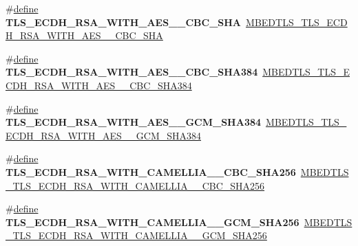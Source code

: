 \begin{DoxyCompactItemize}
\item 
\mbox{\label{compat-1_83_8h_a82177482378436bd1be8a62bb003f7de}} 
\#\hyperlink{structdefine}{define} {\bfseries T\+L\+S\+\_\+\+E\+C\+D\+H\+\_\+\+R\+S\+A\+\_\+\+W\+I\+T\+H\+\_\+\+A\+E\+S\+\_\+\_\+\+C\+B\+C\+\_\+\+S\+HA}~\hyperlink{ssl__ciphersuites_8h_a81461d59d23becd836c6a80bf9a6d1cf}{M\+B\+E\+D\+T\+L\+S\+\_\+\+T\+L\+S\+\_\+\+E\+C\+D\+H\+\_\+\+R\+S\+A\+\_\+\+W\+I\+T\+H\+\_\+\+A\+E\+S\+\_\+\_\+\+C\+B\+C\+\_\+\+S\+HA}
\item 
\mbox{\label{compat-1_83_8h_afd26d3c412c9b7a99d9b15fdc78a67eb}} 
\#\hyperlink{structdefine}{define} {\bfseries T\+L\+S\+\_\+\+E\+C\+D\+H\+\_\+\+R\+S\+A\+\_\+\+W\+I\+T\+H\+\_\+\+A\+E\+S\+\_\+\_\+\+C\+B\+C\+\_\+\+S\+H\+A384}~\hyperlink{ssl__ciphersuites_8h_a47e26eaa7be9c306df31bbbe97f9053d}{M\+B\+E\+D\+T\+L\+S\+\_\+\+T\+L\+S\+\_\+\+E\+C\+D\+H\+\_\+\+R\+S\+A\+\_\+\+W\+I\+T\+H\+\_\+\+A\+E\+S\+\_\+\_\+\+C\+B\+C\+\_\+\+S\+H\+A384}
\item 
\mbox{\label{compat-1_83_8h_ade1889f8b954d53bc910e1e016679d39}} 
\#\hyperlink{structdefine}{define} {\bfseries T\+L\+S\+\_\+\+E\+C\+D\+H\+\_\+\+R\+S\+A\+\_\+\+W\+I\+T\+H\+\_\+\+A\+E\+S\+\_\+\_\+\+G\+C\+M\+\_\+\+S\+H\+A384}~\hyperlink{ssl__ciphersuites_8h_aa3b28cdb1e1e0b0b8a7c91546ccbdd64}{M\+B\+E\+D\+T\+L\+S\+\_\+\+T\+L\+S\+\_\+\+E\+C\+D\+H\+\_\+\+R\+S\+A\+\_\+\+W\+I\+T\+H\+\_\+\+A\+E\+S\+\_\+\_\+\+G\+C\+M\+\_\+\+S\+H\+A384}
\item 
\mbox{\label{compat-1_83_8h_ac4a3fbbc789b041b9ee72cf931237a7a}} 
\#\hyperlink{structdefine}{define} {\bfseries T\+L\+S\+\_\+\+E\+C\+D\+H\+\_\+\+R\+S\+A\+\_\+\+W\+I\+T\+H\+\_\+\+C\+A\+M\+E\+L\+L\+I\+A\+\_\+\_\+\+C\+B\+C\+\_\+\+S\+H\+A256}~\hyperlink{ssl__ciphersuites_8h_a241fb84d48131e45e80eb4cd05ef1b69}{M\+B\+E\+D\+T\+L\+S\+\_\+\+T\+L\+S\+\_\+\+E\+C\+D\+H\+\_\+\+R\+S\+A\+\_\+\+W\+I\+T\+H\+\_\+\+C\+A\+M\+E\+L\+L\+I\+A\+\_\+\_\+\+C\+B\+C\+\_\+\+S\+H\+A256}
\item 
\mbox{\label{compat-1_83_8h_adf33633aa33826f92aed761e7c522e71}} 
\#\hyperlink{structdefine}{define} {\bfseries T\+L\+S\+\_\+\+E\+C\+D\+H\+\_\+\+R\+S\+A\+\_\+\+W\+I\+T\+H\+\_\+\+C\+A\+M\+E\+L\+L\+I\+A\+\_\+\_\+\+G\+C\+M\+\_\+\+S\+H\+A256}~\hyperlink{ssl__ciphersuites_8h_aa83af95fddb27edf5d8caf77a3d11452}{M\+B\+E\+D\+T\+L\+S\+\_\+\+T\+L\+S\+\_\+\+E\+C\+D\+H\+\_\+\+R\+S\+A\+\_\+\+W\+I\+T\+H\+\_\+\+C\+A\+M\+E\+L\+L\+I\+A\+\_\+\_\+\+G\+C\+M\+\_\+\+S\+H\+A256}

\end{DoxyCompactItemize}
